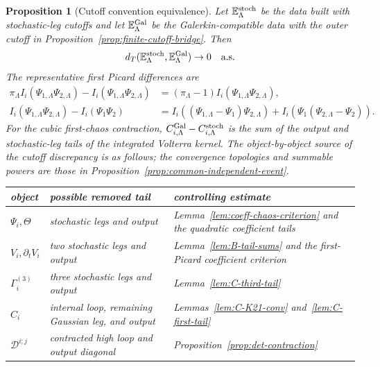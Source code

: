 \documentclass[10pt]{amsart}
\renewcommand{\arraystretch}{1.03}
\numberwithin{equation}{section}
\theoremstyle{plain}
\newtheorem{proposition}[theorem]{Proposition}
\theoremstyle{definition}
\theoremstyle{remark}
\begin{document}
\begin{proposition}[Cutoff convention equivalence]\label{prop:cutoff-convention-equivalence}
Let $\mathbb E_\Lambda^{\rm stoch}$ be the data built with stochastic-leg cutoffs and let $\mathbb E_\Lambda^{\rm Gal}$ be the Galerkin-compatible data with the outer cutoff in Proposition~\ref{prop:finite-cutoff-bridge}.  Then
\begin{equation}\label{eq:cutoff-convention-equivalence}
        d_T(\mathbb E_\Lambda^{\rm stoch},\mathbb E_\Lambda^{\rm Gal})\to0
        \quad\hbox{a.s.}
\end{equation}
The representative first Picard differences are
\begin{align}
        \pi_\Lambda I_i(\Psi_{1,\Lambda}\Psi_{2,\Lambda})-I_i(\Psi_{1,\Lambda}\Psi_{2,\Lambda})
        &=(\pi_\Lambda-1)I_i(\Psi_{1,\Lambda}\Psi_{2,\Lambda}),\label{eq:cutoff-diff-V-output}\\
        I_i(\Psi_{1,\Lambda}\Psi_{2,\Lambda})-I_i(\Psi_1\Psi_2)
        &=I_i((\Psi_{1,\Lambda}-\Psi_1)\Psi_{2,\Lambda})+I_i(\Psi_1(\Psi_{2,\Lambda}-\Psi_2)).\label{eq:cutoff-diff-V-leg}
\end{align}
For the cubic first-chaos contraction, \(C_{i,\Lambda}^{\rm Gal}-C_{i,\Lambda}^{\rm stoch}\) is the sum of the output and stochastic-leg tails of the integrated Volterra kernel.
The object-by-object source of the cutoff discrepancy is as follows; the convergence topologies and summable powers are those in Proposition~\ref{prop:common-independent-event}.
\begin{center}
\scriptsize
\renewcommand{\arraystretch}{1.14}
\begin{tabular}{@{}p{}p{}p{}@{}}
\toprule
object & possible removed tail & controlling estimate \\
\midrule
$\Psi_i,\Theta$ & stochastic legs and output & Lemma~\ref{lem:coeff-chaos-criterion} and the quadratic coefficient tails \\
$V_i,\partial_tV_i$ & two stochastic legs and output & Lemma~\ref{lem:B-tail-sums} and the first-Picard coefficient criterion \\
$\Gamma_i^{(3)}$ & three stochastic legs and output & Lemma~\ref{lem:C-third-tail} \\
$C_i$ & internal loop, remaining Gaussian leg, and output & Lemmas~\ref{lem:C-K21-conv} and~\ref{lem:C-first-tail} \\
$\mathcal D^{i;j}$ & contracted high loop and output diagonal & Proposition~\ref{prop:det-contraction} \\

\end{tabular}
\end{center}
\end{proposition}
\end{document}
